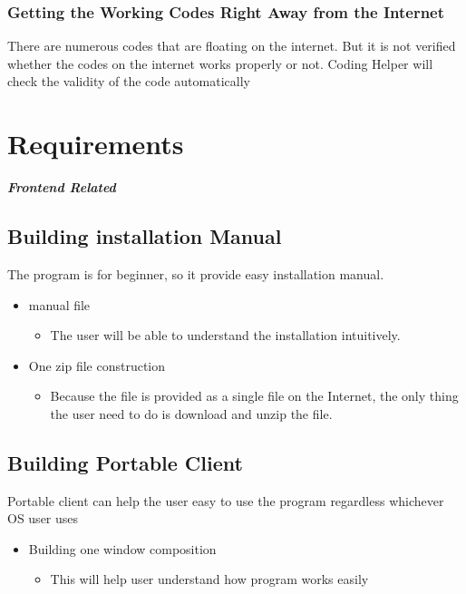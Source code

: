 \documentclass[conference]{IEEEtran}
\begin{document}
\subsubsection{Getting the Working Codes Right Away from the Internet}
There are numerous codes that are floating on the internet. But it is not verified whether the codes on the internet works properly or not. Coding Helper will check the validity of the code automatically 


\section{Requirements} %
\label{sec:requirements}


\textit{\textbf{Frontend Related}}
\textit{ }

\subsection{Building installation Manual}
 The program is for beginner, so it provide easy installation manual.

\begin{itemize}
  \item manual file
  \begin{itemize}
    \item The user will be able to understand the installation intuitively.
  \end{itemize}
  \item One zip file construction
  \begin{itemize}
    \item Because the file is provided as a single file on the Internet, the only thing the user need to do is download and unzip the file.
  \end{itemize}
\end{itemize}
\textit{ }


\subsection{Building Portable Client}
 Portable client can help the user easy to use the program regardless whichever OS user uses

\begin{itemize}
  \item Building one window composition
  \begin{itemize}
    \item This will help user understand how program works easily
  \end{itemize}
\end{itemize}
\textit{ }
\end{document}
